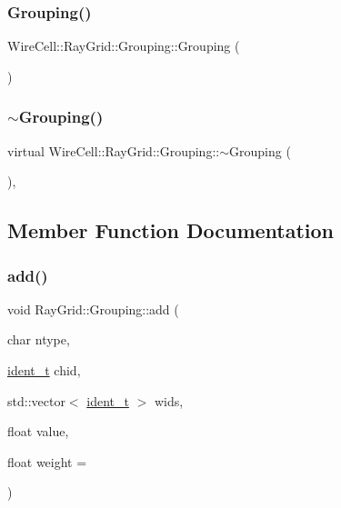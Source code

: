 \subsubsection{\texorpdfstring{Grouping()}{Grouping()}}
{\footnotesize\ttfamily Wire\+Cell\+::\+Ray\+Grid\+::\+Grouping\+::\+Grouping (\begin{DoxyParamCaption}{ }\end{DoxyParamCaption})\hspace{0.3cm}{\ttfamily [default]}}

\mbox{\label{class_wire_cell_1_1_ray_grid_1_1_grouping_af53fed96735c381bc8725c92e602fa13}} 
\subsubsection{\texorpdfstring{$\sim$\+Grouping()}{~Grouping()}}
{\footnotesize\ttfamily virtual Wire\+Cell\+::\+Ray\+Grid\+::\+Grouping\+::$\sim$\+Grouping (\begin{DoxyParamCaption}{ }\end{DoxyParamCaption})\hspace{0.3cm}{\ttfamily [virtual]}, {\ttfamily [default]}}



\subsection{Member Function Documentation}
\mbox{\label{class_wire_cell_1_1_ray_grid_1_1_grouping_a7aad92465bc7a1126e9e45997388a77b}} 
\subsubsection{\texorpdfstring{add()}{add()}}
{\footnotesize\ttfamily void Ray\+Grid\+::\+Grouping\+::add (\begin{DoxyParamCaption}\item[{char}]{ntype,  }\item[{\hyperlink{class_wire_cell_1_1_ray_grid_1_1_grouping_aa7b318b7f8e9a48aa15d037bd046a09b}{ident\+\_\+t}}]{chid,  }\item[{std\+::vector$<$ \hyperlink{class_wire_cell_1_1_ray_grid_1_1_grouping_aa7b318b7f8e9a48aa15d037bd046a09b}{ident\+\_\+t} $>$}]{wids,  }\item[{float}]{value,  }\item[{float}]{weight = {} }\end{DoxyParamCaption})\hspace{0.3cm}{\ttfamily [virtual]}}



